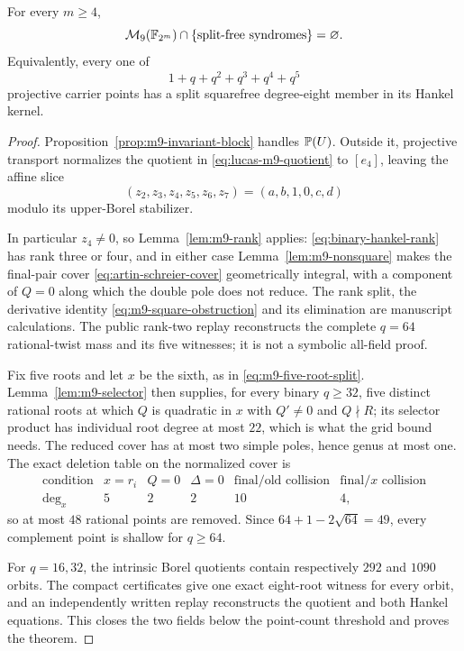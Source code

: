 \begin{theorem}\label{thm:m9-shallow}%
%
%
%
%
For every $m\geq4$,
\[
 \mathcal M_9(\mathbb F_{2^m})\cap\{\textup{split-free syndromes}\}
 =\varnothing .
\]
Equivalently, every one of
\[
                  1+q+q^2+q^3+q^4+q^5
\]
projective carrier points has a split squarefree degree-eight member in its
Hankel kernel.
\end{theorem}

\begin{proof}
Proposition~\ref{prop:m9-invariant-block} handles $\mathbb P(U)$.  Outside it,
projective transport normalizes the quotient in
\eqref{eq:lucas-m9-quotient} to $[e_4]$, leaving
the affine slice
\[
              (z_2,z_3,z_4,z_5,z_6,z_7)=(a,b,1,0,c,d)
\]
modulo its upper-Borel stabilizer.

In particular $z_4\neq0$, so Lemma~\ref{lem:m9-rank} applies:
\eqref{eq:binary-hankel-rank} has rank three or four, and in either case
Lemma~\ref{lem:m9-nonsquare} makes the final-pair cover
\eqref{eq:artin-schreier-cover} geometrically integral, with a component of
$Q=0$ along which the double pole does not reduce.  The rank split, the
derivative identity \eqref{eq:m9-square-obstruction} and its elimination are
manuscript calculations.  The public rank-two replay reconstructs the
complete \(q=64\) rational-twist mass and its five witnesses; it is not a
symbolic all-field proof.

Fix five roots and let $x$ be the sixth, as in
\eqref{eq:m9-five-root-split}.  Lemma~\ref{lem:m9-selector} then supplies,
for every binary $q\geq32$, five distinct rational roots at which $Q$ is
quadratic in $x$ with $Q'\neq0$ and $Q\nmid R$; its selector product has
individual root degree at most $22$, which is what the grid bound needs.
The reduced cover has at
most two simple poles, hence genus at most one.  The exact deletion table on the
normalized cover is
\[
\begin{array}{c|ccccc}
\text{condition}&x=r_i&Q=0&\Delta=0&
\text{final/old collision}&\text{final/}x\text{ collision}\\
\hline
\deg_x&5&2&2&10&4,
\end{array}
\]
so at most $48$ rational points are removed.  Since
$64+1-2\sqrt{64}=49$, every complement point is shallow for
$q\geq64$.

For $q=16,32$, the intrinsic Borel quotients contain respectively
$292$ and $1090$ orbits.  The compact certificates give one exact
eight-root witness for every orbit, and an independently written replay
reconstructs the quotient and both Hankel equations.  This closes the two
fields below the point-count threshold and proves the theorem.
\end{proof}

